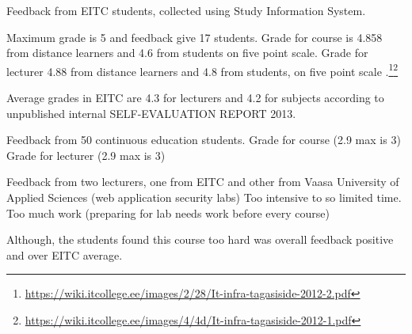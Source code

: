 Feedback from \gls{EITC} students, collected using Study Information System.

Maximum grade is 5 and feedback give 17 students.
Grade for course is 4.858 from distance learners and  4.6 from students on five point scale.
Grade for lecturer 4.88 from distance learners and 4.8 from students, on five point scale
.\footnote{\url{https://wiki.itcollege.ee/images/2/28/It-infra-tagasiside-2012-2.pdf}}\footnote{\url{https://wiki.itcollege.ee/images/4/4d/It-infra-tagasiside-2012-1.pdf}}

Average grades in \gls{EITC} are 4.3 for lecturers and 4.2 for subjects according to unpublished internal SELF-EVALUATION REPORT 2013.

Feedback from 50 continuous education students.
Grade for course (2.9 max is 3)
Grade for lecturer (2.9 max is 3)

Feedback from two lecturers, one from \gls{EITC} and other from Vaasa University of Applied Sciences (web application security labs)
Too intensive to so limited time.
Too much work (preparing for lab needs work before every course)



Although, the students found this course too hard was overall feedback positive and over \gls{EITC} average.